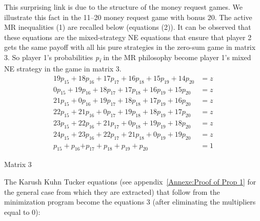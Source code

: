 \begin{Article}
\begin{refsection}[Umbhauer]
This surprising link is due to the structure of the money request games.
We illustrate this fact in the 11--20 money request game with bonus 20.
The active MR inequalities (1) are recalled below (equations (2)). It
can be observed that these equations are the mixed-strategy NE equations
that ensure that player 2 gets the same payoff with all his pure
strategies in the zero-sum game in matrix 3. So player 1's probabilities
\emph{p\textsubscript{i}} in the MR philosophy become player 1's mixed
NE strategy in the game in matrix 3.
%
\begin{align*}
19p_{15} + 18p_{16} + 17p_{17} + 16p_{18} + 15p_{19} + 14p_{20} &= z \\
0p_{15} + 19p_{16} + 18p_{17} + 17p_{18} + 16p_{19} + 15p_{20} &= z \\
21p_{15} + 0p_{16} + 19p_{17} + 18p_{18} + 17p_{19} + 16p_{20} &= z \\
22p_{15} + 21p_{16} + 0p_{17} + 19p_{18} + 18p_{19} + 17p_{20} &= z \\ \tag{2}
23p_{15} + 22p_{16} + 21p_{17} + 0p_{18} + 19p_{19} + 18p_{20} &= z \\
24p_{15} + 23p_{16} + 22p_{17} + 21p_{18} + 0p_{19} + 19p_{20} &= z \\
p_{15} + p_{16}{+ p}_{17} + p_{18} + p_{19} + p_{20} &= 1
\end{align*}

\begin{table}[h!]
\centering
Matrix 3\par
\vspace{0.2cm}
\label{matx3}
\end{table}

The Karush Kuhn Tucker equations (see appendix~\ref{Annexe:Proof of Prop 1} for the general case from which they are extracted) that follow from the minimization program
become the equations 3 (after eliminating the multipliers equal to 0):


\end{refsection}
\end{Article}
